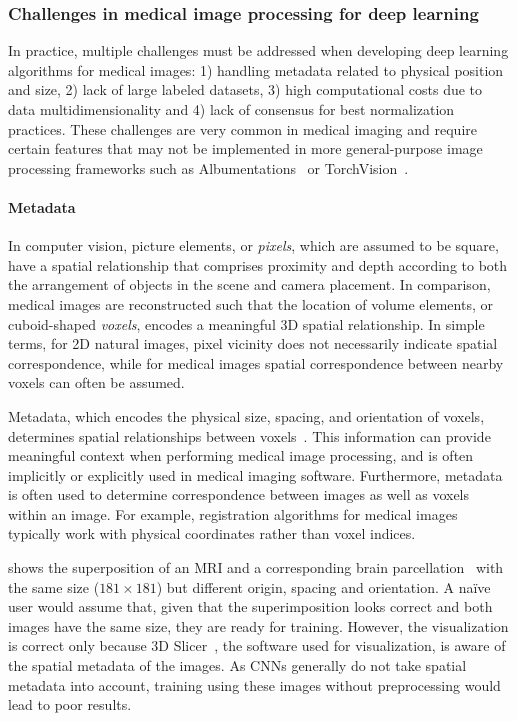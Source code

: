 \subsubsection{Challenges in medical image processing for deep learning}
\label{sec:challenges}


In practice, multiple challenges must be addressed when developing deep learning algorithms for medical images:
1) handling metadata related to physical position and size,
2) lack of large labeled datasets,
3) high computational costs due to data multidimensionality and
4) lack of consensus for best normalization practices.
These challenges are very common in medical imaging and require certain features that may not be implemented in more general-purpose image processing frameworks such as Albumentations~\cite{buslaev_albumentations_2020} or TorchVision~\cite{paszke_pytorch_2019}.


\paragraph{Metadata}
\label{sec:metadata}

In computer vision, picture elements, or \textit{pixels}, which are assumed to be square, have a spatial relationship that comprises proximity and depth according to both the arrangement of objects in the scene and camera placement.
In comparison, medical images are reconstructed such that the location of volume elements, or cuboid-shaped \textit{voxels}, encodes a meaningful 3D spatial relationship.
In simple terms, for 2D natural images, pixel vicinity does not necessarily indicate spatial correspondence, while for medical images spatial correspondence between nearby voxels can often be assumed.

Metadata, which encodes the physical size, spacing, and orientation of voxels, determines spatial relationships between voxels~\cite{larobina_medical_2014}.
This information can provide meaningful context when performing medical image processing, and is often implicitly or explicitly used in medical imaging software.
Furthermore, metadata is often used to determine correspondence between images as well as voxels within an image.
For example, registration algorithms for medical images typically work with physical coordinates rather than voxel indices.

 shows the superposition of an \ac{MRI} and a corresponding brain parcellation~\cite{cardoso_geodesic_2015} with the same size ($181 \times 181$) but different origin, spacing and orientation.
A naïve user would assume that, given that the superimposition looks correct and both images have the same size, they are ready for training.
However, the visualization is correct only because 3D Slicer~\cite{fedorov_3d_2012}, the software used for visualization, is aware of the spatial metadata of the images.
As \acp{CNN} generally do not take spatial metadata into account, training using these images without preprocessing would lead to poor results.


